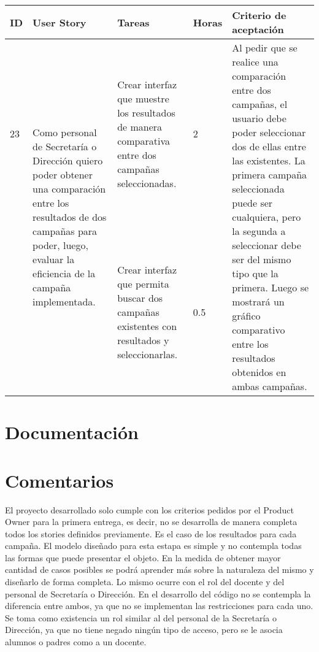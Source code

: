 \documentclass[a4paper, 11pt]{article}
\begin{document}
\begin{table}[H]
\centering
\begin{tabular}{ | p{0.5cm} | p{4cm} | p{5cm} | p{0.85cm} | p{5cm} |}
\hline 
ID & User Story & Tareas & Horas & Criterio de aceptación \\ \hline \hline

23 & \multirow{2}{4cm}{Como personal de Secretaría o Dirección quiero poder obtener una comparación entre los resultados de dos campañas para poder, luego, evaluar la eficiencia de la campaña implementada.} & Crear interfaz que muestre los resultados de manera comparativa entre dos campañas seleccionadas. & 2 & \multirow{2}{5cm}{Al pedir que se realice una comparación entre dos campañas, el usuario debe poder seleccionar dos de ellas entre las existentes. La primera campaña seleccionada puede ser cualquiera, pero la segunda a seleccionar debe ser del mismo tipo que la primera. Luego se mostrará un gráfico comparativo entre los resultados obtenidos en ambas campañas. } \\[3cm] \cline{3-4}
& & Crear interfaz que permita buscar dos campañas existentes con resultados y seleccionarlas. & 0.5 & \\[3cm] \hline

\end{tabular}
\end{table}

\newpage

\section{Documentación}



\newpage

\section{Comentarios}
El proyecto desarrollado solo cumple con los criterios pedidos por el Product Owner para la primera entrega, es decir, no se desarrolla de manera completa todos los stories definidos previamente. 
Es el caso de los resultados para cada campaña. El modelo diseñado para esta estapa es simple y no contempla todas las formas que puede presentar el objeto. En la medida de obtener mayor cantidad de casos posibles se podrá aprender más sobre la naturaleza del mismo y diseñarlo de forma completa. 
Lo mismo ocurre con el rol del docente y del personal de Secretaría o Dirección. En el desarrollo del código no se contempla la diferencia entre ambos, ya que no se implementan las restricciones para cada uno. Se toma como existencia un rol similar al del personal de la Secretaría o Dirección, ya que no tiene negado ningún tipo de acceso, pero se le asocia alumnos o padres como a un docente. 
\end{document}

